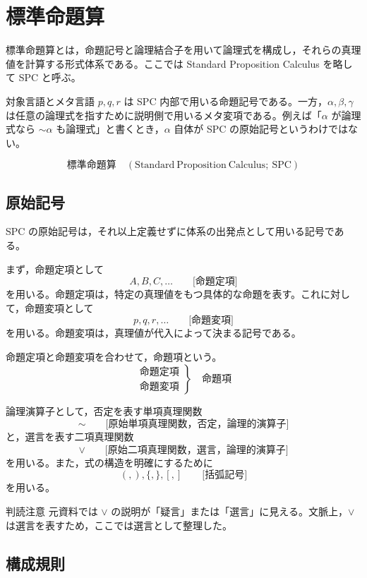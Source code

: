 \documentclass[../main.tex]{subfiles}
\begin{document}
\section{標準命題算}

標準命題算とは，命題記号と論理結合子を用いて論理式を構成し，それらの真理値を計算する形式体系である。ここでは Standard Proposition Calculus を略して SPC と呼ぶ。
\begin{sidebox}[TBred]{対象言語とメタ言語}
  \(p,q,r\) は SPC 内部で用いる命題記号である。一方，\(\alpha,\beta,\gamma\) は任意の論理式を指すために説明側で用いるメタ変項である。例えば「\(\alpha\) が論理式なら \(\sim\alpha\) も論理式」と書くとき，\(\alpha\) 自体が SPC の原始記号というわけではない。
\end{sidebox}
\[
  \text{標準命題算}
  \quad
  (\mathrm{Standard\ Proposition\ Calculus};\ \mathrm{SPC})
\]

\subsection{原始記号}

SPC の原始記号は，それ以上定義せずに体系の出発点として用いる記号である。

まず，命題定項として
\[
  A,B,C,\ldots
  \qquad
  \text{[命題定項]}
\]
を用いる。命題定項は，特定の真理値をもつ具体的な命題を表す。これに対して，命題変項として
\[
  p,q,r,\ldots
  \qquad
  \text{[命題変項]}
\]
を用いる。命題変項は，真理値が代入によって決まる記号である。

命題定項と命題変項を合わせて，命題項という。
\[
  \left.
  \begin{array}{l}
    \text{命題定項} \\
    \text{命題変項}
  \end{array}
  \right\}
  \quad
  \text{命題項}
\]

論理演算子として，否定を表す単項真理関数
\[
  \sim
  \qquad
  \text{[原始単項真理関数，否定，論理的演算子]}
\]
と，選言を表す二項真理関数
\[
  \lor
  \qquad
  \text{[原始二項真理関数，選言，論理的演算子]}
\]
を用いる。また，式の構造を明確にするために
\[
  (, ), \{, \}, [,]
  \qquad
  \text{[括弧記号]}
\]
を用いる。

\begin{sidebox}[TBred]{判読注意}
  元資料では \(\lor\) の説明が「疑言」または「選言」に見える。文脈上，\(\lor\) は選言を表すため，ここでは選言として整理した。
\end{sidebox}

\subsection{構成規則}
\end{document}
